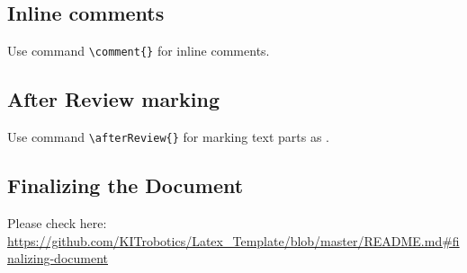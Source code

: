\subsection{Inline comments}
Use command \texttt{\textbackslash comment\{\}} for inline comments.

\subsection{After Review marking}
Use command \texttt{\textbackslash afterReview\{\}} for marking text parts as .

\subsection{Finalizing the Document}
\label{ssec:finalizing_the_document}
Please check here: \url{https://github.com/KITrobotics/Latex_Template/blob/master/README.md#finalizing-document}
